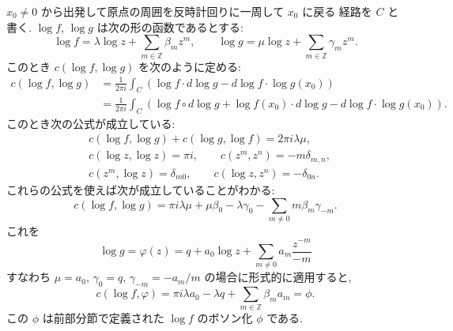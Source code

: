 \documentclass[12pt,twoside]{jarticle}
\newcommand\Z{{\mathbb Z}} %
\theoremstyle{definition} %
\theoremstyle{definition} %
\theoremstyle{definition} %
\numberwithin{theorem}{section}
\numberwithin{equation}{section}
\numberwithin{figure}{section}
\numberwithin{table}{section}
\begin{document}
$x_0\ne 0$ から出発して原点の周囲を反時計回りに一周して $x_0$ に戻る
経路を $C$ と書く. $\log f$, $\log g$ は次の形の函数であるとする:
\[
\log f = \lambda\log z+\sum_{m\in\Z} \beta_m  z^m, \qquad
\log g = \mu\log z    +\sum_{m\in\Z} \gamma_m z^m.
\]
このとき $c(\log f,\log g)$ を次のように定める:
\begin{align*}
c(\log f,\log g)
&
=\frac{1}{2\pi i}
\int_C(\log f\cdot d\log g - d\log f\cdot\log g(x_0))
\\ &
=\frac{1}{2\pi i}
\int_C(\log f\circ d\log g + \log f(x_0)\cdot d\log g- d\log f\cdot\log g(x_0)).
\end{align*}
このとき次の公式が成立している:
\begin{align*}
&
c(\log f,\log g)+c(\log g,\log f)=2\pi i\lambda\mu,
\\ &
c(\log z,\log z)=\pi i, \qquad
c(z^m,z^n) = -m\delta_{m,n},
\\ &
c(z^m,\log z) = \delta_{m0}, \qquad
c(\log z, z^n) = -\delta_{0n}.
\end{align*}
これらの公式を使えば次が成立していることがわかる:
\[
c(\log f,\log g)
= \pi i \lambda\mu + \mu\beta_0 - \lambda \gamma_0 
- \sum_{m\ne 0} m\beta_m\gamma_{-m}. 
\]
これを
\[
\log g = \varphi(z) = q + a_0\log z + \sum_{m\ne 0}a_m\frac{z^{-m}}{-m}
\]
すなわち $\mu=a_0$, $\gamma_0=q$, $\gamma_{-m}=-a_m/m$ 
の場合に形式的に適用すると,
\[
c(\log f,\varphi)
= \pi i \lambda a_0 -\lambda q +\sum_{m\in\Z}\beta_m a_m
= \phi.
\]
この $\phi$ は前部分節で定義された $\log f$ のボソン化 $\phi$ である.


\end{document}
